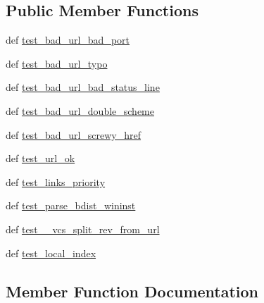 \subsection*{Public Member Functions}
\begin{DoxyCompactItemize}
\item 
def \hyperlink{classsetuptools_1_1tests_1_1test__packageindex_1_1TestPackageIndex_ac071e33101496fd8f05eb2a4797fc927}{test\+\_\+bad\+\_\+url\+\_\+bad\+\_\+port}
\item 
def \hyperlink{classsetuptools_1_1tests_1_1test__packageindex_1_1TestPackageIndex_aef0f7f2e9ef3046b539d97eb1e249732}{test\+\_\+bad\+\_\+url\+\_\+typo}
\item 
def \hyperlink{classsetuptools_1_1tests_1_1test__packageindex_1_1TestPackageIndex_ad7eb72e4efe68dda8f2e4f40924b2d52}{test\+\_\+bad\+\_\+url\+\_\+bad\+\_\+status\+\_\+line}
\item 
def \hyperlink{classsetuptools_1_1tests_1_1test__packageindex_1_1TestPackageIndex_a0c0bef1e85edf5797764cda6d0702a08}{test\+\_\+bad\+\_\+url\+\_\+double\+\_\+scheme}
\item 
def \hyperlink{classsetuptools_1_1tests_1_1test__packageindex_1_1TestPackageIndex_a195c8e47ab209d3cb24764c82b5f4db7}{test\+\_\+bad\+\_\+url\+\_\+screwy\+\_\+href}
\item 
def \hyperlink{classsetuptools_1_1tests_1_1test__packageindex_1_1TestPackageIndex_ab8f631e5553b15d9ac46d3d643da50e2}{test\+\_\+url\+\_\+ok}
\item 
def \hyperlink{classsetuptools_1_1tests_1_1test__packageindex_1_1TestPackageIndex_a441c351ab683cdd72938976c06922bb1}{test\+\_\+links\+\_\+priority}
\item 
def \hyperlink{classsetuptools_1_1tests_1_1test__packageindex_1_1TestPackageIndex_ac1c0878f455cc056ae750c468af97af8}{test\+\_\+parse\+\_\+bdist\+\_\+wininst}
\item 
def \hyperlink{classsetuptools_1_1tests_1_1test__packageindex_1_1TestPackageIndex_a0a7e39c3ce4d6745d732f0fdc72813d0}{test\+\_\+\+\_\+vcs\+\_\+split\+\_\+rev\+\_\+from\+\_\+url}
\item 
def \hyperlink{classsetuptools_1_1tests_1_1test__packageindex_1_1TestPackageIndex_a78f3a55f19bb48966e76c5d3ae57f285}{test\+\_\+local\+\_\+index}
\end{DoxyCompactItemize}


\subsection{Member Function Documentation}
\hypertarget{classsetuptools_1_1tests_1_1test__packageindex_1_1TestPackageIndex_a0a7e39c3ce4d6745d732f0fdc72813d0}{}

